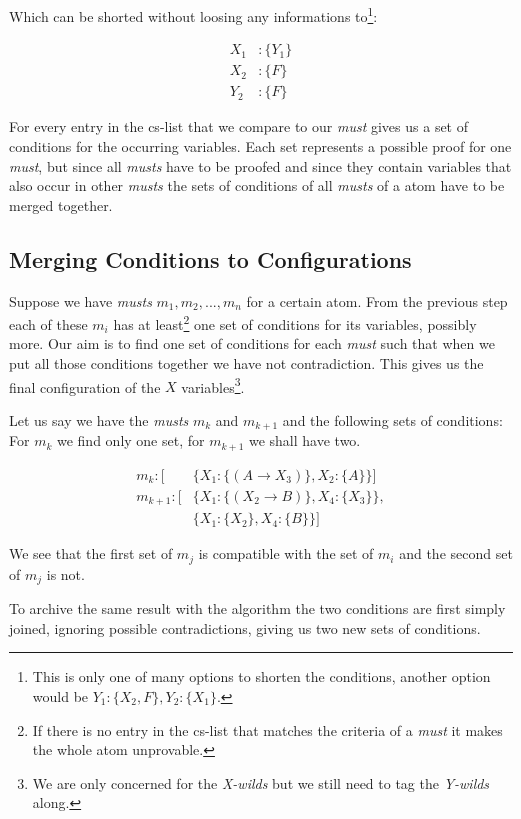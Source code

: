 Which can be shorted without loosing any informations to\footnote{This is only one of many options to shorten the conditions, another option would be $Y_1: \{X_2, F\}, Y_2:\{X_1\}$.}:

\begin{align*}
	X_1 &: \{Y_1\} \\
	X_2 &: \{F\} \\
	Y_2 &: \{F\}
\end{align*}

For every entry in the cs-list that we compare to our \emph{must} gives us a set of conditions for the occurring variables. Each set represents a possible proof for one \emph{must}, but since all \emph{musts} have to be proofed and since they contain variables that also occur in other \emph{musts} the sets of conditions of all \emph{musts} of a atom have to be merged together.

\subsection{Merging Conditions to Configurations}
Suppose we have \emph{musts} $m_1, m_2, ..., m_n$ for a certain atom. From the previous step each of these $m_i$ has at least\footnote{If there is no entry in the cs-list that matches the criteria of a \emph{must} it makes the whole atom unprovable.} one set of conditions for its variables, possibly more. Our aim is to find one set of conditions for each \emph{must} such that when we put all those conditions together we have not contradiction. This gives us the final configuration of the $X$ variables\footnote{We are only concerned for the \emph{X-wilds} but we still need to tag the \emph{Y-wilds} along.}.

Let us say we have the \emph{musts} $m_k$ and $m_{k+1}$ and the following sets of conditions: For $m_k$ we find only one set, for $m_{k+1}$ we shall have two.


\begin{align*}
	m_k: [	& \{X_1: \{(A \rightarrow X_3)\}, X_2: \{A\}\}]\\
	m_{k+1}: [	& \{X_1: \{(X_2 \rightarrow B)\}, X_4: \{X_3\}\},\\
			& \{X_1: \{X_2\}, X_4: \{B\}\}]
\end{align*}

We see that the first set of $m_j$ is compatible with the set of $m_i$ and the second set of $m_j$ is not.

To archive the same result with the algorithm the two conditions are first simply joined, ignoring possible contradictions, giving us two new sets of conditions.

